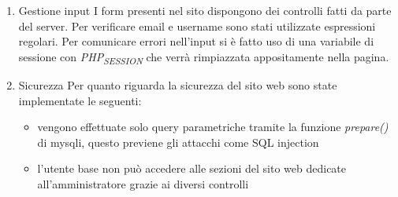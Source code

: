 \documentclass[11pt]{article}
\begin{document}
\begin{enumerate}
\item Gestione input
\label{sec:orge2cd23e}
I form presenti nel sito dispongono dei controlli fatti da parte del server. Per verificare email e username sono stati utilizzate espressioni regolari.
Per comunicare errori nell'input si è fatto uso di una variabile di sessione con \emph{PHP\textsubscript{SESSION}} che verrà rimpiazzata appositamente nella pagina.
\item Sicurezza
\label{sec:orgbd0b2c6}
Per quanto riguarda la sicurezza del sito web sono state implementate le seguenti:
\begin{itemize}
\item vengono effettuate solo query parametriche tramite la funzione \emph{prepare()} di mysqli, questo previene gli attacchi come SQL injection
\item l'utente base non può accedere alle sezioni del sito web dedicate all'amministratore grazie ai diversi controlli
\end{itemize}
\end{enumerate}
\end{document}
